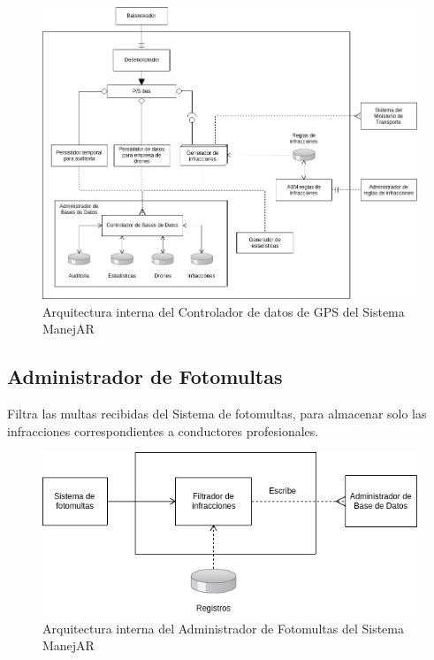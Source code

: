 \begin{figure}
\centerline{\includegraphics[width=1\textwidth]{./imagenes/arquitectura_tp2/controlador_datos_gps.png}}
\caption{Arquitectura interna del Controlador de datos de GPS del Sistema ManejAR}
\end{figure}


\subsection{Administrador de Fotomultas}
Filtra las multas recibidas del Sistema de fotomultas, para almacenar solo las 
infracciones correspondientes a conductores profesionales.


\begin{figure}
\centerline{\includegraphics[width=1\textwidth]{./imagenes/arquitectura_tp2/administrador_fotomultas.png}}
\caption{Arquitectura interna del Administrador de Fotomultas del Sistema ManejAR}
\end{figure}


